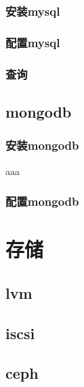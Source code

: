 \documentclass[letterpaper,10pt,english]{sphinxmanual}
\begin{document}
\subsection{安装mysql}
\label{\detokenize{database/mysql:id1}}

\subsection{配置mysql}
\label{\detokenize{database/mysql:id2}}

\subsection{查询}
\label{\detokenize{database/mysql:id3}}

\section{mongodb}
\label{\detokenize{database/mongodb:mongodb}}\label{\detokenize{database/mongodb::doc}}

\subsection{安装mongodb}
\label{\detokenize{database/mongodb:id1}}
aaa


\subsection{配置mongodb}
\label{\detokenize{database/mongodb:id2}}

\chapter{存储}
\label{\detokenize{storage/readme:id1}}\label{\detokenize{storage/readme::doc}}

\section{lvm}
\label{\detokenize{storage/lvm:lvm}}\label{\detokenize{storage/lvm::doc}}

\section{iscsi}
\label{\detokenize{storage/iscsi:iscsi}}\label{\detokenize{storage/iscsi::doc}}

\section{ceph}
\label{\detokenize{storage/ceph:ceph}}\label{\detokenize{storage/ceph::doc}}
\end{document}
